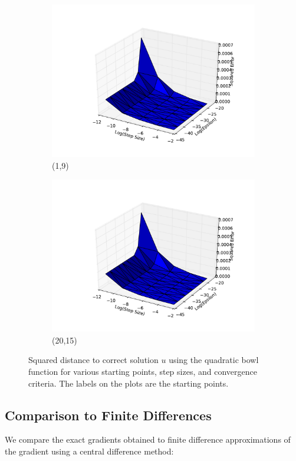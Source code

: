 \documentclass[10pt,psamsfonts]{amsart}
\theoremstyle{definition}
\theoremstyle{remark}
\numberwithin{equation}{section}
\begin{document}
\begin{figure}
\begin{subfigure}[b]{0.23\textwidth}
		\includegraphics[width=\textwidth]{hw1_1-2_2.pdf}
		\caption{(1,9)}
	\end{subfigure}
	\begin{subfigure}[b]{0.23\textwidth}
		\includegraphics[width=\textwidth]{hw1_1-2_3.pdf}
		\caption{(20,15)}
	\end{subfigure}
	\caption{Squared distance to correct solution $u$ using the quadratic bowl function for various starting points, step sizes, and convergence criteria. The labels on the plots are the starting points.}
\end{figure}
	

\subsection{Comparison to Finite Differences} We compare the exact gradients obtained to finite difference approximations of the gradient using a central difference method:
\end{document}
